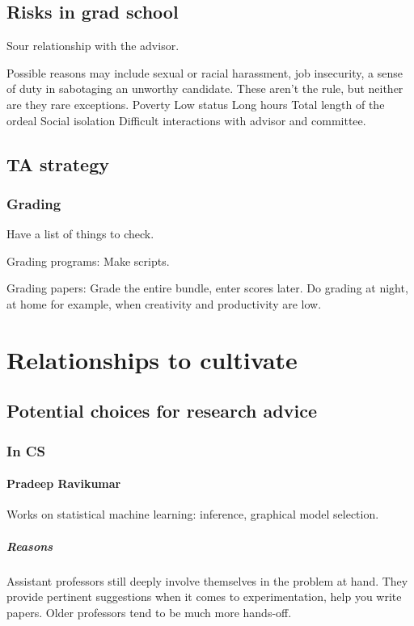 \documentclass[oneside, article]{memoir}
\begin{document}
\section{Risks in grad school}
\subitem Sour relationship with the advisor.

\subsubitem Possible reasons may include sexual or racial harassment, job insecurity, a sense of duty in sabotaging an unworthy candidate. These aren't the rule, but neither are they rare exceptions.
\subitem Poverty
\subitem Low status
\subitem Long hours
\subitem Total length of the ordeal
\subitem Social isolation
\subitem Difficult interactions with advisor and committee.


\section{TA strategy}

\subsection{Grading}
\subitem Have a list of things to check.

\subitem Grading programs:
\subsubitem Make scripts.

\subitem Grading papers:
\subsubitem Grade the entire bundle, enter scores later.
\subsubitem Do grading at night, at home for example, when creativity and productivity are low.

\chapter{Relationships to cultivate}
\section{Potential choices for research advice}
\subsection{In CS}
\subsubsection{Pradeep Ravikumar}
Works on statistical machine learning: inference, graphical model selection.

\paragraph*{Reasons}
Assistant professors still deeply involve themselves in the problem at hand. They provide pertinent suggestions when it comes to experimentation, help you write papers. Older professors tend to be much more hands-off.
\end{document}
